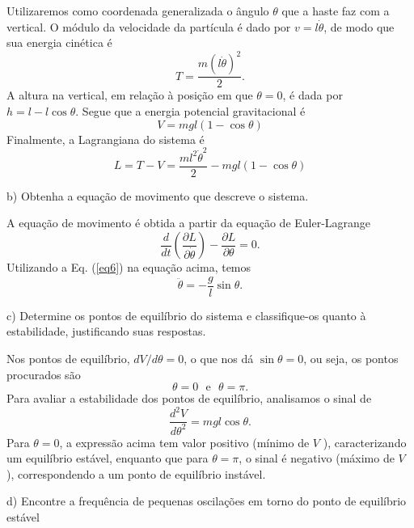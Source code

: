 \begin{enumerate}[start=1,label={\bfseries Q\arabic*.}]
\resposta Utilizaremos como coordenada generalizada o ângulo $\theta$ que a haste faz com a vertical. O módulo da velocidade da partícula é dado por $v = l \dot{\theta}$, de modo que sua energia cinética é
%
\begin{equation}
  T = \frac{m(l \dot{\theta})^{2}}{2} .
\end{equation}
%
A altura na vertical, em relação à posição em que $\theta = 0$, é dada por $h = l - l \cos \theta$. Segue que a energia potencial gravitacional é
%
\begin{equation}
  V = mgl(1 - \cos \theta)
\end{equation}
%
Finalmente, a Lagrangiana do sistema é
%
\begin{equation}\label{eq6}
  L = T - V = \frac{ml^{2} \dot{\theta}^{2}}{2} - mgl(1 - \cos \theta)
\end{equation}
%


b) Obtenha a equação de movimento que descreve o sistema.

\resposta A equação de movimento é obtida a partir da equação de Euler-Lagrange
%
\begin{equation}
  \frac{d}{dt} \left( \frac{\partial L}{\partial \dot{\theta}}  \right) - \frac{\partial L}{\partial \theta} = 0 .
\end{equation}
%
Utilizando a Eq. (\ref{eq6}) na equação acima, temos
\begin{equation}
  \ddot{\theta} = - \frac{g}{l} \sin \theta .
\end{equation}

c) Determine os pontos de equilíbrio do sistema e classifique-os quanto à estabilidade, justificando suas respostas.

\resposta Nos pontos de equilíbrio, $dV / d\theta = 0$, o que nos dá $\sin \theta = 0$, ou seja, os pontos procurados são
$$
\theta = 0 \ \ \ \mbox{e} \ \ \ \theta = \pi .
$$
Para avaliar a estabilidade dos pontos de equilíbrio, analisamos o sinal de
\begin{equation}
  \frac{d^{2}V}{d\theta^{2}} = mgl \cos \theta .
\end{equation}
%
Para $\theta = 0$, a expressão acima tem valor positivo (mínimo de $V$ ), caracterizando um equilíbrio estável, enquanto que para $\theta = \pi$, o sinal é negativo (máximo de $V$ ), correspondendo a um ponto de equilíbrio instável.

d) Encontre a frequência de pequenas oscilações em torno do ponto de equilíbrio estável


\end{enumerate}
